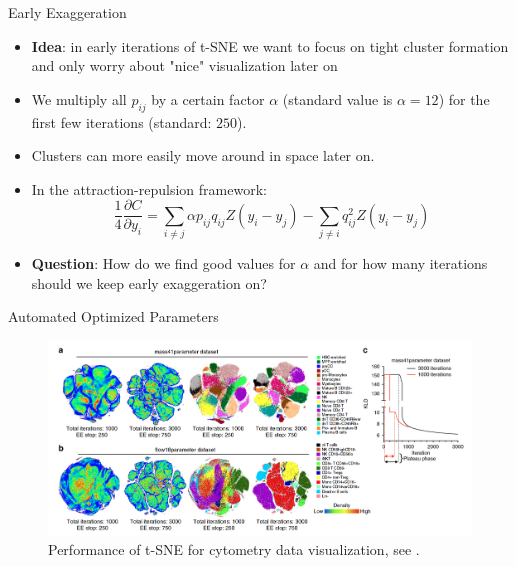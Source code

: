 \begin{frame}{Early Exaggeration}
    \begin{itemize}
        \item \textbf{Idea}: in early iterations of t-SNE we want to focus on tight cluster formation and only worry about "nice" visualization later on \pause
        \item We multiply all $p_{ij}$ by a certain factor $\alpha$ (standard value is $\alpha= 12$) for the first few iterations (standard: $250$). 
        \item Clusters can more easily move around in space later on. \pause 
        \item In the attraction-repulsion framework: 
        \[ \frac{1}{4} \frac{\partial C}{\partial y_i} = \sum_{i\neq j} \alpha p_{ij} q_{ij} Z (y_i - y_j) - \sum_{j \neq i} q_{ij}^2 Z (y_i - y_j)
        \] \pause 
        \item \textbf{Question}: How do we find good values for $\alpha$ and for how many iterations should we keep early exaggeration on? 
    \end{itemize}
\end{frame}

\begin{frame}{Automated Optimized Parameters}
    \begin{figure}
        \centering
        \includegraphics[width=\textwidth]{nature_EE_stop.png}
        \caption{Performance of t-SNE for cytometry data visualization, see \cite{belkina2019}.}
    \end{figure} 
\end{frame}

